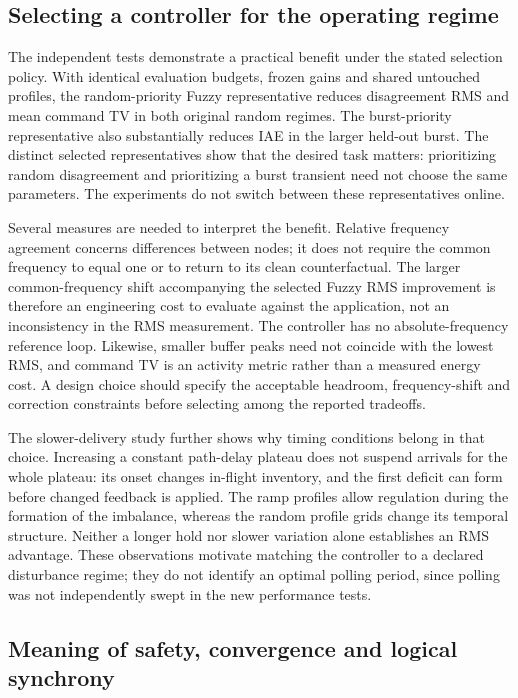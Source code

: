 \subsection{Selecting a controller for the operating regime}
\label{detail:subsec:discussion_selection}

The independent tests demonstrate a practical benefit under the stated
selection policy. With identical evaluation budgets, frozen gains and
shared untouched profiles, the random-priority Fuzzy representative
reduces disagreement RMS and mean command TV in both original random
regimes. The burst-priority representative also substantially reduces
IAE in the larger held-out burst. The distinct selected representatives
show that the desired task matters: prioritizing random disagreement
and prioritizing a burst transient need not choose the same parameters.
The experiments do not switch between these representatives online.

Several measures are needed to interpret the benefit. Relative
frequency agreement concerns differences between nodes; it does not
require the common frequency to equal one or to return to its clean
counterfactual. The larger common-frequency shift accompanying the
selected Fuzzy RMS improvement is therefore an engineering cost to
evaluate against the application, not an inconsistency in the RMS
measurement. The controller has no absolute-frequency reference loop.
Likewise, smaller buffer peaks need not coincide with the lowest RMS,
and command TV is an activity metric rather than a measured energy
cost. A design choice should specify the acceptable headroom,
frequency-shift and correction constraints before selecting among the
reported tradeoffs.

The slower-delivery study further shows why timing conditions belong
in that choice. Increasing a constant path-delay plateau does not
suspend arrivals for the whole plateau: its onset changes in-flight
inventory, and the first deficit can form before changed feedback is
applied. The ramp profiles allow regulation during the formation of
the imbalance, whereas the random profile grids change its temporal
structure. Neither a longer hold nor slower variation alone establishes
an RMS advantage. These observations motivate matching the controller
to a declared disturbance regime; they do not identify an optimal
polling period, since polling was not independently swept in the new
performance tests.

\subsection{Meaning of safety, convergence and logical synchrony}
\label{detail:subsec:discussion_scope}

